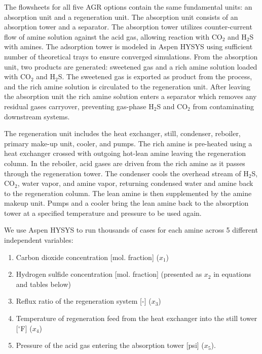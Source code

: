 \documentclass[11pt]{report}
\begin{document}
The flowsheets for all five AGR options contain the same fundamental units: an absorption unit and a regeneration unit. The absorption unit consists of an absorption tower and a separator. The absorption tower utilizes counter-current flow of amine solution against the acid gas, allowing reaction with CO$_2$ and H$_2$S with amines. The adsorption tower is modeled in Aspen HYSYS using sufficient number of theoretical trays to ensure converged simulations. From the absorption unit, two products are generated: sweetened gas and a rich amine solution loaded with CO$_2$ and H$_2$S. The sweetened gas is exported as product from the process, and the rich amine solution is circulated to the regeneration unit. After leaving the absorption unit the rich amine solution enters a separator which removes any residual gases carryover, preventing gas-phase H$_2$S and CO$_2$ from contaminating downstream systems.

The regeneration unit includes the heat exchanger, still, condenser, reboiler, primary make-up unit, cooler, and pumps.   The rich amine is pre-heated using a heat exchanger crossed with outgoing hot-lean amine leaving the regeneration column. In the reboiler, acid gases are driven from the rich amine as it passes through the regeneration tower. The condenser cools the overhead stream of H$_2$S, CO$_2$, water vapor, and amine vapor, returning condensed water and amine back to the regeneration column. The lean amine is then supplemented by the amine makeup unit. Pumps and a cooler bring the lean amine back to the absorption tower at a specified temperature and pressure to be used again.  

We use Aspen HYSYS to run thousands of cases for each amine across 5 different independent variables: 
\begin{enumerate}
\item Carbon dioxide concentration [mol. fraction] ($x_1$)
\item Hydrogen sulfide concentration [mol. fraction] (presented as $x_2$ in equations and tables below)
\item Reflux ratio of the regeneration system [-] ($x_3$)
\item Temperature of regeneration feed from the heat exchanger into the still tower [$^\circ$F] ($x_4$)
\item Pressure of the acid gas entering the absorption tower [psi] ($x_5$).
\end{enumerate}
\end{document}
